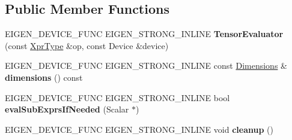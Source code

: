 \subsection*{Public Member Functions}
\begin{DoxyCompactItemize}
\item 
\mbox{\label{struct_eigen_1_1_tensor_evaluator_3_01const_01_tensor_broadcasting_op_3_01_broadcast_00_01_arg_type_01_4_00_01_device_01_4_a05322f3be5349cb0bfb6fc024dc4e536}} 
E\+I\+G\+E\+N\+\_\+\+D\+E\+V\+I\+C\+E\+\_\+\+F\+U\+NC E\+I\+G\+E\+N\+\_\+\+S\+T\+R\+O\+N\+G\+\_\+\+I\+N\+L\+I\+NE {\bfseries Tensor\+Evaluator} (const \hyperlink{class_eigen_1_1_tensor_broadcasting_op}{Xpr\+Type} \&op, const Device \&device)
\item 
\mbox{\label{struct_eigen_1_1_tensor_evaluator_3_01const_01_tensor_broadcasting_op_3_01_broadcast_00_01_arg_type_01_4_00_01_device_01_4_acfd1ee27d705afb6e102eb01dcb091f3}} 
E\+I\+G\+E\+N\+\_\+\+D\+E\+V\+I\+C\+E\+\_\+\+F\+U\+NC E\+I\+G\+E\+N\+\_\+\+S\+T\+R\+O\+N\+G\+\_\+\+I\+N\+L\+I\+NE const \hyperlink{struct_eigen_1_1_d_sizes}{Dimensions} \& {\bfseries dimensions} () const
\item 
\mbox{\label{struct_eigen_1_1_tensor_evaluator_3_01const_01_tensor_broadcasting_op_3_01_broadcast_00_01_arg_type_01_4_00_01_device_01_4_a3176de963d60846dbca409f0748ee596}} 
E\+I\+G\+E\+N\+\_\+\+D\+E\+V\+I\+C\+E\+\_\+\+F\+U\+NC E\+I\+G\+E\+N\+\_\+\+S\+T\+R\+O\+N\+G\+\_\+\+I\+N\+L\+I\+NE bool {\bfseries eval\+Sub\+Exprs\+If\+Needed} (Scalar $\ast$)
\item 
\mbox{\label{struct_eigen_1_1_tensor_evaluator_3_01const_01_tensor_broadcasting_op_3_01_broadcast_00_01_arg_type_01_4_00_01_device_01_4_ad0631e1b1df6f4a4e8018bcdec6a60f9}} 
E\+I\+G\+E\+N\+\_\+\+D\+E\+V\+I\+C\+E\+\_\+\+F\+U\+NC E\+I\+G\+E\+N\+\_\+\+S\+T\+R\+O\+N\+G\+\_\+\+I\+N\+L\+I\+NE void {\bfseries cleanup} ()
\item 

\end{DoxyCompactItemize}
